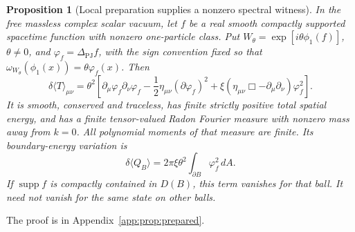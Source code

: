 \documentclass[12pt]{article}
\newtheorem{proposition}[theorem]{Proposition}
\theoremstyle{definition}
\theoremstyle{remark}
\newcommand{\dT}{\delta\langle T\rangle}
\newcommand{\ev}[1]{\langle #1\rangle}
\begin{document}
\begin{proposition}[Local preparation supplies a nonzero spectral witness]\label{prop:prepared}
In the free massless complex scalar vacuum, let \(f\) be a real smooth compactly
supported spacetime function with nonzero one-particle class. Put
\(W_\theta=\exp[i\theta\phi_1(f)]\), \(\theta\ne0\), and
\(\varphi_f=\Delta_{\mathrm{PJ}}f\), with the sign convention fixed so that
\(\omega_{W_\theta}(\phi_1(x))=\theta\varphi_f(x)\).
Then
\begin{equation}\label{eq:preparedsource}
\dT_{\mu\nu}=\theta^2\left[
\partial_\mu\varphi_f\partial_\nu\varphi_f
-\frac12\eta_{\mu\nu}(\partial\varphi_f)^2
+\xi(\eta_{\mu\nu}\Box-\partial_\mu\partial_\nu)\varphi_f^2\right].
\end{equation}
It is smooth, conserved and traceless, has finite strictly positive total spatial energy,
and has a finite tensor-valued Radon Fourier measure with nonzero mass away from \(k=0\).
All polynomial moments of that measure are finite. Its boundary-energy variation is
\begin{equation}\label{eq:preparededge}
\delta\ev{Q_B}=2\pi\xi\theta^2\int_{\partial B}\varphi_f^2\,dA.
\end{equation}
If \(\operatorname{supp}f\) is compactly contained in \(D(B)\), this term vanishes for
that ball. It need not vanish for the same state on other balls.
\end{proposition}

The proof is in Appendix~\ref{app:prop:prepared}.
\end{document}
